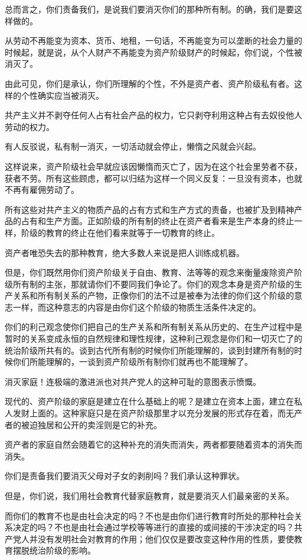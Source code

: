 \documentclass[10pt, UTF8]{book} %
\begin{document}
总而言之，你们责备我们，是说我们要消灭你们的那种所有制。的确，我们是要这样做的。

从劳动不再能变为资本、货币、地租，一句话，不再能变为可以垄断的社会力量的时候起，就是说，从个人财产不再能变为资产阶级财产的时候起，你们说，个性被消灭了。

由此可见，你们是承认，你们所理解的个性，不外是资产者、资产阶级私有者。这样的个性确实应当被消灭。

共产主义并不剥夺任何人占有社会产品的权力，它只剥夺利用这种占有去奴役他人劳动的权力。

有人反驳说，私有制一消灭，一切活动就会停止，懒惰之风就会兴起。

这样说来，资产阶级社会早就应该因懒惰而灭亡了，因为在这个社会里劳者不获，获者不劳。所有这些顾虑，都可以归结为这样一个同义反复：一旦没有资本，也就不再有雇佣劳动了。

所有这些对共产主义的物质产品的占有方式和生产方式的责备，也被扩及到精神产品的占有和生产方面。正如阶级的所有制的终止在资产者看来是生产本身的终止一样，阶级的教育的终止在他们看来就等于一切教育的终止。

资产者唯恐失去的那种教育，绝大多数人来说是把人训练成机器。

但是，你们既然用你们资产阶级关于自由、教育、法等等的观念来衡量废除资产阶级所有制的主张，那就请你们不要同我们争论了。你们的观念本身是资产阶级的生产关系和所有制关系的产物，正像你们的法不过是被奉为法律的你们这个阶级的意志一样，而这种意志的内容是由你们这个阶级的物质生活条件决定的。

你们的利己观念使你们把自己的生产关系和所有制关系从历史的、在生产过程中是暂时的关系变成永恒的自然规律和理性规律，这种利己观念是你们和一切灭亡了的统治阶级所共有的。谈到古代所有制的时候你们所能理解的，谈到封建所有制的时候你们所能理解的，一谈到资产阶级所有制你们就再也不能理解了。

消灭家庭！连极端的激进派也对共产党人的这种可耻的意图表示愤慨。

现代的、资产阶级的家庭是建立在什么基础上的呢？是建立在资本上面，建立在私人发财上面的。这种家庭只是在资产阶级那里才以充分发展的形式存在着，而无产者的被迫独居和公开的卖淫则是它的补充。

资产者的家庭自然会随着它的这种补充的消失而消失，两者都要随着资本的消失而消失。

你们是责备我们要消灭父母对子女的剥削吗？我们承认这种罪状。

但是，你们说，我们用社会教育代替家庭教育，就是要消灭人们最亲密的关系。

而你们的教育不也是由社会决定的吗？不也是由你们进行教育时所处的那种社会关系决定的吗？不也是由社会通过学校等等进行的直接的或间接的干涉决定的吗？共产党人并没有发明社会对教育的作用；他们仅仅是要改变这种作用的性质，要使教育摆脱统治阶级的影响。
\end{document}
